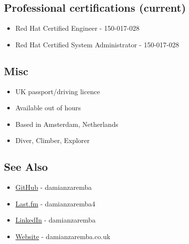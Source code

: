 \subsection{Professional certifications
(current)}\label{professional-certifications-current}

\begin{itemize}
\itemsep1pt\parskip0pt
\item
  Red Hat Certified Engineer - 150-017-028
\item
  Red Hat Certified System Administrator - 150-017-028
\end{itemize}

\subsection{Misc}\label{misc}

\begin{itemize}
\itemsep1pt\parskip0pt
\item
  UK passport/driving licence
\item
  Available out of hours
\item
  Based in Amsterdam, Netherlands
\item
  Diver, Climber, Explorer
\end{itemize}

\subsection{See Also}\label{see-also}

\begin{itemize}
\itemsep1pt\parskip0pt
\item
  \href{https://github.com/damianzaremba}{GitHub} - damianzaremba
\item
  \href{http://last.fm/user/damianzaremba4}{Last.fm} - damianzaremba4
\item
  \href{http://uk.linkedin.com/in/damianzaremba}{LinkedIn} -
  damianzaremba
\item
  \href{http://damianzaremba.co.uk}{Website} - damianzaremba.co.uk
\end{itemize}
